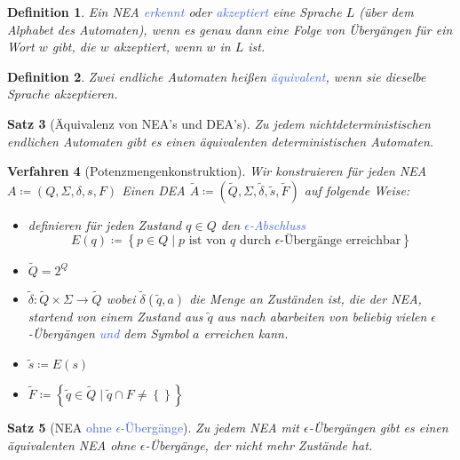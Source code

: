 \documentclass[11pt]{article}
\newcommand{\tcol}[1]{\textcolor{RoyalBlue}{#1}}
\newcommand{\set}[1]{\left\lbrace #1\right\rbrace}
\theoremstyle{break}
\newtheorem{satz}{Satz}[section]
\newtheorem{defi}[satz]{Definition}
\newtheorem{verf}[satz]{Verfahren}
\begin{document}
\begin{defi} 
Ein NEA \tcol{erkennt} oder \tcol{akzeptiert} eine Sprache $L$ (über dem Alphabet des Automaten), wenn es genau dann eine Folge von Übergängen für ein Wort $w$ gibt, die $w$ akzeptiert, wenn $w$ in $L$ ist.
\end{defi}

\begin{defi} 
Zwei endliche Automaten heißen \tcol{äquivalent}, wenn sie dieselbe Sprache akzeptieren.
\end{defi}

\begin{satz}[Äquivalenz von NEA's und DEA's]
Zu jedem nichtdeterministischen endlichen Automaten gibt es einen äquivalenten deterministischen Automaten.
\end{satz}

\begin{verf}[Potenzmengenkonstruktion]
Wir konstruieren für jeden NEA $A\coloneqq (Q,\Sigma ,\delta ,s,F)$ Einen DEA $\tilde{A}\coloneqq (\tilde{Q},\Sigma ,\tilde{\delta},\tilde{s},\tilde{F})$ auf folgende Weise:
\begin{itemize}
\item definieren für jeden Zustand $q\in Q$ den \tcol{$\epsilon$-Abschluss} \[E(q)\coloneqq \set{p\in Q\mid p \text{ ist von } q \text{ durch } \epsilon\text{-Übergänge erreichbar}}\]
\item $\tilde{Q} = 2^Q$
\item $\tilde{\delta}\colon\tilde{Q}\times\Sigma\to\tilde{Q}$ wobei $\tilde{\delta}(\tilde{q},a)$ die Menge an Zuständen ist, die der NEA, startend von einem Zustand aus $\tilde{q}$ aus nach abarbeiten von beliebig vielen $\epsilon$-Übergängen \tcol{und} dem Symbol $a$ erreichen kann.
\item $\tilde{s}\coloneqq E(s)$
\item $\tilde{F}\coloneqq \set{\tilde{q}\in\tilde{Q}\mid\tilde{q}\cap F\neq\set{}}$
\end{itemize}
\end{verf}

\begin{satz}[NEA \tcol{ohne $\epsilon$-Übergänge}]
Zu jedem NEA mit $\epsilon$-Übergängen gibt es einen äquivalenten NEA ohne $\epsilon$-Übergänge, der nicht mehr Zustände hat.
\end{satz}
\end{document}
